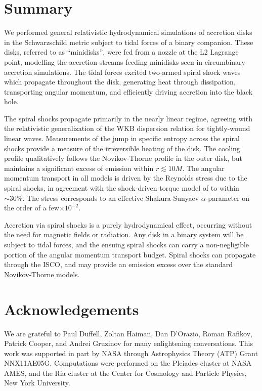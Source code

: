 \documentclass{emulateapj}
\newcommand{\al}{\alpha}
\begin{document}

\section{Summary}
\label{sec:summary}


We performed general relativistic hydrodynamical simulations of accretion disks in the Schwarzschild metric subject to tidal forces of a binary companion.  These disks, referred to as ``minidisks'', were fed from a nozzle at the L2 Lagrange point, modelling the accretion streams feeding minidisks seen in circumbinary accretion simulations.  The tidal forces excited two-armed spiral shock waves which propagate throughout the disk,  generating heat through dissipation, transporting angular momentum, and efficiently driving accretion into the black hole.

The spiral shocks propagate primarily in the nearly linear regime, agreeing with the relativistic generalization of the WKB dispersion relation for tightly-wound linear waves.  Measurements of the jump in specific entropy across the spiral shocks provide a measure of the irreversible heating of the disk.  The cooling profile qualitatively follows the Novikov-Thorne profile in the outer disk, but maintains a significant excess of emission within $r \lesssim 10 M$.  The angular momentum transport in all models is driven by the Reynolds stress due to the spiral shocks, in agreement with the shock-driven torque model of \citep{Rafikov16} to within $\sim30\%$.  The stress corresponds to an effective Shakura-Sunyaev $\al$-parameter on the order of a few$\times 10^{-2}$.

Accretion via spiral shocks is a purely hydrodynamical effect, occurring without the need for magnetic fields or radiation.  Any disk in a binary system will be subject to tidal forces, and the ensuing spiral shocks can carry a non-negligible portion of the angular momentum transport budget.  Spiral shocks can propagate through the ISCO, and may provide an emission excess over the standard Novikov-Thorne models.



\section{Acknowledgements}
We are grateful to Paul Duffell, Zoltan Haiman, Dan D'Orazio, Roman Rafikov, Patrick Cooper, and Andrei Gruzinov for many enlightening conversations.  This work was supported in part by NASA through Astrophysics Theory (ATP) Grant NNX11AE05G.  Computations were performed on the Pleiades cluster at NASA AMES, and the Ria cluster at the Center for Cosmology and Particle Physics, New York University.


\newpage





%
\end{document}
